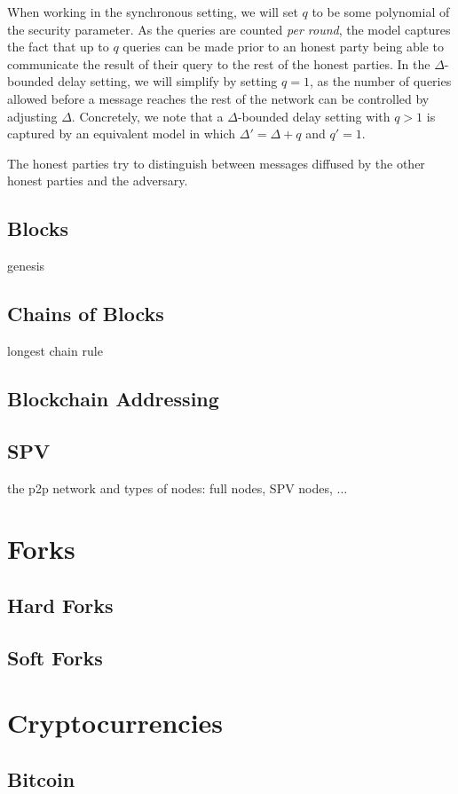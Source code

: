 When working in the synchronous setting, we will set $q$ to be some polynomial
of the security parameter. As the queries are counted \emph{per round}, the
model captures the fact that up to $q$ queries can be made prior to an honest
party being able to communicate the result of their query to the rest of the
honest parties. In the $\Delta$-bounded delay setting, we will simplify by
setting $q = 1$, as the number of queries allowed before a message reaches the
rest of the network can be controlled by adjusting $\Delta$. Concretely, we note
that a $\Delta$-bounded delay setting with $q > 1$ is captured by an equivalent
model in which $\Delta' = \Delta + q$ and $q' = 1$.

The honest parties try to distinguish between messages diffused by the other
honest parties and the adversary.

\subsection{Blocks}
genesis
\subsection{Chains of Blocks}
longest chain rule
\subsection{Blockchain Addressing}
\subsection{SPV}
the p2p network and types of nodes: full nodes, SPV nodes, ...

\section{Forks}
\subsection{Hard Forks}
\subsection{Soft Forks}

\section{Cryptocurrencies}
\subsection{Bitcoin}
